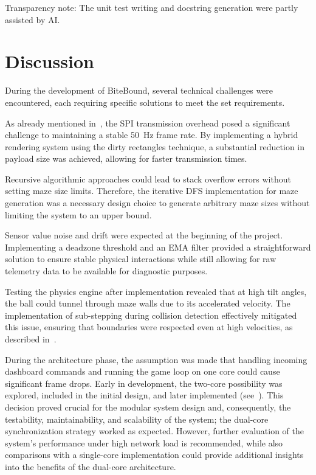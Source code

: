 \documentclass[10pt,journal,final,a4paper]{IEEEtran}
\begin{document}
Transparency note: The unit test writing and docstring generation were partly assisted by AI.

\section{Discussion}
\label{sec:discussion}

During the development of BiteBound, several technical challenges were encountered, each requiring specific solutions to meet the set requirements.

As already mentioned in~, the SPI transmission overhead posed a significant challenge to maintaining a stable \SI{50}{\hertz} frame rate. By implementing a hybrid rendering system using the dirty rectangles technique, a substantial reduction in payload size was achieved, allowing for faster transmission times.

Recursive algorithmic approaches could lead to stack overflow errors without setting maze size limits. Therefore, the iterative DFS implementation for maze generation was a necessary design choice to generate arbitrary maze sizes without limiting the system to an upper bound.

Sensor value noise and drift were expected at the beginning of the project. Implementing a deadzone threshold and an EMA filter provided a straightforward solution to ensure stable physical interactions while still allowing for raw telemetry data to be available for diagnostic purposes.

Testing the physics engine after implementation revealed that at high tilt angles, the ball could tunnel through maze walls due to its accelerated velocity. The implementation of sub-stepping during collision detection effectively mitigated this issue, ensuring that boundaries were respected even at high velocities, as described in~.

During the architecture phase, the assumption was made that handling incoming dashboard commands and running the game loop on one core could cause significant frame drops. Early in development, the two-core possibility was explored, included in the initial design, and later implemented (see~). This decision proved crucial for the modular system design and, consequently, the testability, maintainability, and scalability of the system; the dual-core synchronization strategy worked as expected. However, further evaluation of the system's performance under high network load is recommended, while also comparisons with a single-core implementation could provide additional insights into the benefits of the dual-core architecture.
\end{document}
